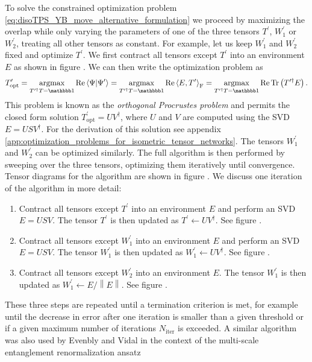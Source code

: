To solve the constrained optimization problem \eqref{eq:disoTPS_YB_move_alternative_formulation} we proceed by maximizing the overlap while only varying the parameters of one of the three tensors $T^\prime$, $W_1^\prime$ or $W_2^\prime$, treating all other tensors as constant. For example, let us keep $W_1^\prime$ and $W_2^\prime$ fixed and optimize $T^\prime$. We first contract all tensors except $T^\prime$ into an environment $E$ as shown in figure . We can then write the optimization problem as
\begin{equation}
	T^\prime_\text{opt} = \underset{T^{\prime\dagger}T = \id}{\argmax} \Re\left\langle\Psi\middle|\Psi^\prime\right\rangle = \underset{T^{\prime\dagger}T = \id}{\argmax}\Re\left\langle E, T^\prime\right\rangle_\text{F} = \underset{T^{\prime\dagger}T = \id}{\argmax}\Re\Tr\left(T^{\prime\dagger}E\right).
\end{equation}
This problem is known as the \textit{orthogonal Procrustes problem} and permits the closed form solution $T^\prime_\text{opt} = UV^\dagger$, where $U$ and $V$ are computed using the SVD $E = USV^\dagger$. For the derivation of this solution see appendix \ref{app:optimization_problems_for_isometric_tensor_networks}. The tensors $W_1^\prime$ and $W_2^\prime$ can be optimized similarly. The full algorithm is then performed by sweeping over the three tensors, optimizing them iteratively until convergence. Tensor diagrams for the algorithm are shown in figure . We discuss one iteration of the algorithm in more detail:
\begin{enumerate}
	\item Contract all tensors except $T^\prime$ into an environment $E$ and perform an SVD $E = USV$. The tensor $T^\prime$ is then updated as $T^\prime\leftarrow UV^\dagger$. See figure .
	\item Contract all tensors except $W_1^\prime$ into an environment $E$ and perform an SVD $E = USV$. The tensor $W_1^\prime$ is then updated as $W_1^\prime\leftarrow UV^\dagger$. See figure .
	\item Contract all tensors except $W_2^\prime$ into an environment $E$. The tensor $W_1^\prime$ is then updated as $W_1^\prime\leftarrow E/\left\lVert E\right\rVert$. See figure .
\end{enumerate}
These three steps are repeated until a termination criterion is met, for example until the decrease in error after one iteration is smaller than a given threshold or if a given maximum number of iterations $N_\text{iter}$ is exceeded. A similar algorithm was also used by Evenbly and Vidal in the context of the multi-scale entanglement renormalization ansatz
